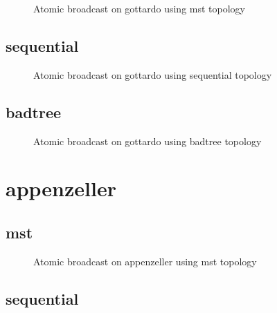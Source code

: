 \begin{figure}[ht!]

\caption{Atomic broadcast on gottardo using mst topology}
\label{fig:ab_gottardo_mst}
\end{figure}
\clearpage\subsection{sequential}

\begin{figure}[ht!]

\caption{Atomic broadcast on gottardo using sequential topology}
\label{fig:ab_gottardo_sequential}
\end{figure}
\clearpage\subsection{badtree}

\begin{figure}[ht!]

\caption{Atomic broadcast on gottardo using badtree topology}
\label{fig:ab_gottardo_badtree}
\end{figure}
\clearpage\newpage\clearpage\section{appenzeller}

\subsection{mst}

\begin{figure}[ht!]

\caption{Atomic broadcast on appenzeller using mst topology}
\label{fig:ab_appenzeller_mst}
\end{figure}
\clearpage\subsection{sequential}

